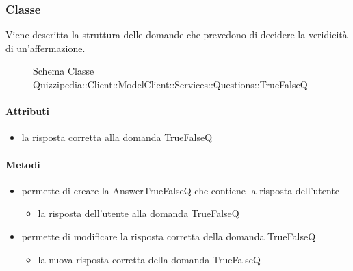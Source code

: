 \subsubsection{Classe }
Viene descritta la struttura delle domande che prevedono di decidere la veridicità di un'affermazione.
\begin{figure}[H]
\centering
\noindent{}
\caption[Schema Classe TrueFalseQ]{Schema Classe Quizzipedia::Client::ModelClient::Services::Questions::TrueFalseQ}
\end{figure}
\paragraph{Attributi}
\begin{itemize}
\item {}
\newline
la risposta corretta alla domanda TrueFalseQ
\end{itemize}
\paragraph{Metodi}
\begin{itemize}
\item {}
\newline
permette di creare la AnswerTrueFalseQ che contiene la risposta dell'utente
\newline
{}
\newline
\begin{itemize}
\item {}
\newline
la risposta dell'utente alla domanda TrueFalseQ
\end{itemize}
\item {}
\newline
permette di modificare la risposta corretta della domanda TrueFalseQ
\newline
{}
\newline
\begin{itemize}
\item {}
\newline
la nuova risposta corretta della domanda TrueFalseQ
\end{itemize}
\end{itemize}
